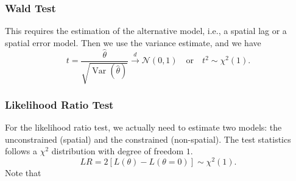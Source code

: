 \documentclass[11pt,a4paper]{amsart}
\theoremstyle{plain}
\theoremstyle{definition}
\begin{document}
\subsubsection{Wald Test}\hfill\par 
This requires the estimation of the alternative model, i.e., a spatial lag or a spatial error model. Then we use the variance estimate, and we have 
\[	t = \frac{\hat{\theta}}{\sqrt{\operatorname{Var}(\hat{\theta})}} \stackrel{d}{\longrightarrow} \mathscr{N}(0, 1) \quad \text{or}\quad t^{2} \sim \chi^{2}(1).	\]

\subsubsection{Likelihood Ratio Test}\hfill\par 
For the likelihood ratio test, we actually need to estimate two models: the unconstrained (spatial) and the constrained (non-spatial). The test statistics follows a $\chi^{2}$ distribution with degree of freedom $1$. 
\[	LR = 2[L(\theta) - L(\theta = 0)] \sim \chi^{2}(1).	\]
Note that 
 
\printbibliography %
		
\end{document}

